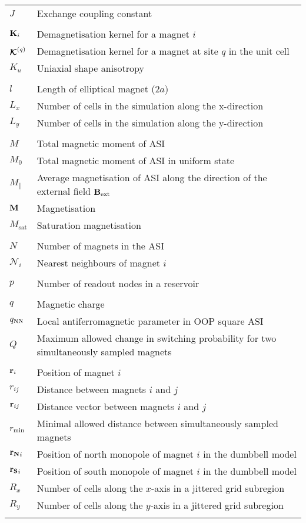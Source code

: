 \begin{longtable}[l]{p{60pt} p{350pt}}
	$J$ & Exchange coupling constant \\
	&\\

	$\boldsymbol{\mathbf{K}}_i$ & Demagnetisation kernel for a magnet $i$ \\
	$\boldsymbol{\mathbf{\mathcal{K}}}^{(q)}$ & Demagnetisation kernel for a magnet at site $q$ in the unit cell \\
	$K_u$ & Uniaxial shape anisotropy \\
	&\\

	$l$ & Length of elliptical magnet ($2a$) \\
	$L_x$ & Number of cells in the simulation along the x-direction \\
	$L_y$ & Number of cells in the simulation along the y-direction \\
	&\\

	$M$ & Total magnetic moment of ASI \\
	$M_0$ & Total magnetic moment of ASI in uniform state \\
	$M_\parallel$ & Average magnetisation of ASI along the direction of the external field $\boldsymbol{\mathbf{B}}_\mathrm{ext}$ \\
	$\boldsymbol{\mathbf{M}}$ & Magnetisation \\
	$M_\mathrm{sat}$ & Saturation magnetisation \\
	&\\

	$N$ & Number of magnets in the ASI \\ %
	$\mathcal{N}_i$ & Nearest neighbours of magnet $i$ \\
	&\\

	$p$ & Number of readout nodes in a reservoir \\
	&\\

	$q$ & Magnetic charge \\
	$q_\mathrm{NN}$ & Local antiferromagnetic parameter in OOP square ASI \\
	$Q$ & Maximum allowed change in switching probability for two simultaneously sampled magnets \\
	&\\

	$\boldsymbol{\mathbf{r}}_i$ & Position of magnet $i$ \\
	$r_{ij}$ & Distance between magnets $i$ and $j$ \\
	$\boldsymbol{\mathbf{r}}_{ij}$ & Distance vector between magnets $i$ and $j$ \\
	$r_\mathrm{min}$ & Minimal allowed distance between simultaneously sampled magnets \\
	$\boldsymbol{\mathbf{r_N}}_i$ & Position of north monopole of magnet $i$ in the dumbbell model \\
	$\boldsymbol{\mathbf{r_S}}_i$ & Position of south monopole of magnet $i$ in the dumbbell model \\
	$R_x$ & Number of cells along the $x$-axis in a jittered grid subregion \\
	$R_y$ & Number of cells along the $y$-axis in a jittered grid subregion \\
	&\\


\end{longtable}
